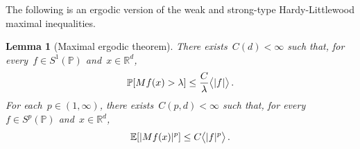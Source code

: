 \documentclass[11pt,twoside]{article} %
\numberwithin{equation}{section}
\newtheorem{lemma}[theorem]{Lemma}
\theoremstyle{definition}
\let\originalleft\left
\let\originalright\right
\renewcommand{\left}{\mathopen{}\mathclose\bgroup\originalleft}
\renewcommand{\right}{\aftergroup\egroup\originalright}
\newcommand*{\Rd}{\ensuremath{\mathbb{R}^d}}
\renewcommand{\P}{\mathbb{P}}
\newcommand{\E}{\mathbb{E}}
\begin{document}
\smallskip

The following is an ergodic version of the weak and strong-type Hardy-Littlewood maximal inequalities.

\begin{lemma}[Maximal ergodic theorem]
\label{l.maximal.ergodic}
There exists~$C(d)<\infty$ such that, for every~$f\in S^1(\P)$ and~$x\in \Rd$, 
\begin{equation}
\P \left[ Mf(x) > \lambda \right] \leq \frac{C}{\lambda} \bigl \langle |f| \bigr\rangle\,. 
\end{equation}
For each~$p\in (1,\infty)$, there exists~$C(p,d)<\infty$ such that, for every~$f \in S^p(\P)$ and~$x\in\Rd$, 
\begin{equation}
\label{e.maximal.ergodic.p}
\E \left[ |Mf(x)|^p \right] 
\leq 
C \bigl\langle |f|^p \bigr\rangle\,. 
\end{equation}
\end{lemma}
\end{document}
